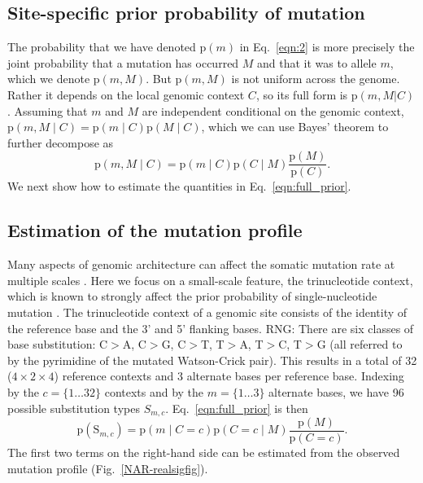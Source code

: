 \documentclass[a4,center,fleqn]{NAR}
\newcommand{\rngcomment}[1]{{\color{red}RNG: #1}}
\begin{document}
\subsection{Site-specific prior probability of mutation}
The probability that we have denoted $\mathrm{p}(m)$ in Eq.~\ref{eqn:2} is more precisely the joint probability that a mutation has occurred $M$ and that it was to allele $m$, which we denote $\mathrm{p}(m,M)$.
But $\mathrm{p}(m,M)$ is not uniform across the genome.
Rather it depends on the local genomic context $C$, so its full form is $\mathrm{p}(m,M | C)$ \cite{Buisson2019}.
Assuming that $m$ and $M$ are independent conditional on the genomic context, $\mathrm{p}(m,M \mid C) = \mathrm{p}(m \mid C) \mathrm{p}(M \mid C)$, which we can use Bayes' theorem to further decompose as 
\begin{equation}
  \label{eqn:full_prior}
  \mathrm{p}(m,M \mid C) = \mathrm{p}(m \mid C) \mathrm{p}(C \mid M)\frac{\mathrm{p}(M)}{\mathrm{p}(C)}.
\end{equation}
We next show how to estimate the quantities in Eq.~\ref{eqn:full_prior}.

\subsection{Estimation of the mutation profile}
Many aspects of genomic architecture can affect the somatic mutation rate at multiple scales \cite{Buisson2019}.
Here we focus on a small-scale feature, the trinucleotide context, which is known to strongly affect the prior probability of single-nucleotide mutation \cite{Nik-Zainal2012a,Alexandrov2015,Lee-Six2018}.
The trinucleotide context of a genomic site consists of the identity of the reference base and the 3' and 5' flanking bases.
\rngcomment{There are six classes of base substitution: C$>$A, C$>$G, C$>$T, T$>$A, T$>$C, T$>$G (all referred to by the pyrimidine of the mutated Watson-Crick pair).
This results in a total of 32 ($4\times 2 \times 4$) reference contexts and 3 alternate bases per reference base.}
Indexing by the $c=\{1 \dots 32\}$ contexts and by the $m = \{1 \dots 3\}$ alternate bases, we have 96 possible substitution types $S_{m,c}$.
Eq.~\ref{eqn:full_prior} is then
\begin{equation}
  \label{eqn:detailed_prior}
  \mathrm{p}(\mathrm{S}_{m,c}) = \mathrm{p}(m \mid C = c) \mathrm{p}(C = c \mid M)\frac{\mathrm{p}(M)}{\mathrm{p}(C = c)}.
\end{equation}
The first two terms on the right-hand side can be estimated from the observed mutation profile (Fig.~\ref{NAR-realsigfig}).
\end{document}
